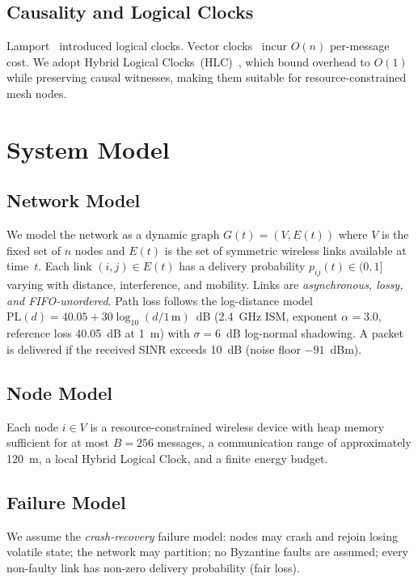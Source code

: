 \documentclass[conference]{IEEEtran}
\begin{document}
\subsection{Causality and Logical Clocks}
Lamport~\cite{lamport_time_1978} introduced logical clocks.  Vector
clocks~\cite{fidge_vector_1988,mattern_vector_1989} incur $O(n)$ per-message
cost.  We adopt Hybrid Logical Clocks~(HLC)~\cite{kulkarni_hlc_2014}, which
bound overhead to $O(1)$ while preserving causal witnesses, making them
suitable for resource-constrained mesh nodes.

\section{System Model}
\label{sec:model}

\subsection{Network Model}
We model the network as a dynamic graph $G(t) = (V, E(t))$ where $V$ is the
fixed set of $n$ nodes and $E(t)$ is the set of symmetric wireless links
available at time~$t$.  Each link $(i,j)\in E(t)$ has a delivery probability
$p_{ij}(t)\in(0,1]$ varying with distance, interference, and mobility.
Links are \emph{asynchronous, lossy, and FIFO-unordered}.  Path loss follows
the log-distance model $\mathrm{PL}(d)=40.05+30\log_{10}(d/1\,\mathrm{m})$~dB
(2.4~GHz ISM, exponent $\alpha=3.0$, reference loss 40.05~dB at 1~m) with
$\sigma=6$~dB log-normal shadowing.  A packet is delivered if the received
SINR exceeds 10~dB (noise floor $-91$~dBm).

\subsection{Node Model}
Each node $i\in V$ is a resource-constrained wireless device with heap memory
sufficient for at most $B=256$ messages, a communication range of approximately
120~m, a local Hybrid Logical Clock, and a finite energy budget.

\subsection{Failure Model}
We assume the \emph{crash-recovery} failure model: nodes may crash and rejoin
losing volatile state; the network may partition; no Byzantine faults are
assumed; every non-faulty link has non-zero delivery probability (fair loss).
\end{document}
